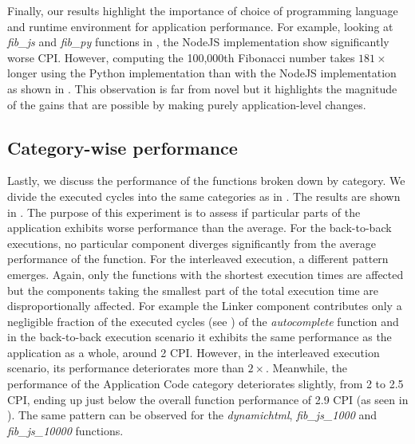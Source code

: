 Finally, our results highlight the importance of choice of programming language and runtime environment for application performance.  For example, looking at \emph{fib\_js} and \emph{fib\_py} functions in , the NodeJS implementation show significantly worse CPI. However, computing the 100,000th Fibonacci number takes $181\times$ longer using the Python implementation than with the NodeJS implementation as shown in . This observation is far from novel but it highlights the magnitude of the gains that are possible by making purely application-level changes.


\subsection{Category-wise performance}
\label{subsec:cat-perf}



Lastly, we discuss the performance of the functions broken down by category. We divide the executed cycles into the same categories as in . The results are shown in . The purpose of this experiment is to assess if particular parts of the application exhibits worse performance than the average. For the back-to-back executions, no particular component diverges significantly from the average performance of the function. For the interleaved execution, a different pattern emerges. Again, only the functions with the shortest execution times are affected but the components taking the smallest part of the total execution time are disproportionally affected. For example the Linker component contributes only a negligible fraction of the executed cycles (see ) of the \emph{autocomplete} function and in the back-to-back execution scenario it exhibits the same performance as the application as a whole, around 2 CPI. However, in the interleaved execution scenario, its performance deteriorates more than $2 \times$.
Meanwhile, the performance of the Application Code category deteriorates slightly, from 2 to 2.5 CPI, ending up just below the overall function performance of 2.9 CPI (as seen in ). The same pattern can be observed for the \emph{dynamichtml}, \emph{fib\_js\_1000} and \emph{fib\_js\_10000}
functions.


